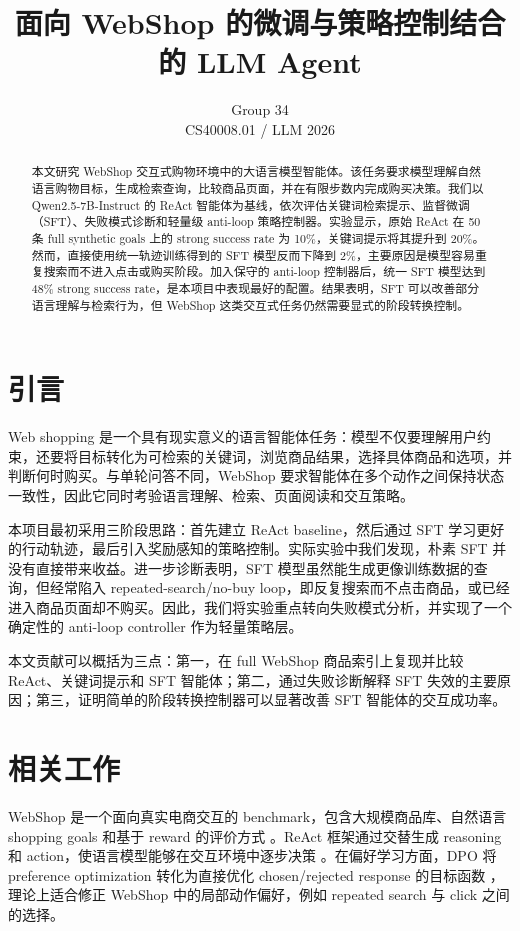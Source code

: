 \documentclass[11pt]{article}
\title{面向 WebShop 的微调与策略控制结合的 LLM Agent}
\author{
  Group 34 \\
  CS40008.01 / LLM 2026
}
\begin{document}
\maketitle

\begin{abstract}
本文研究 WebShop 交互式购物环境中的大语言模型智能体。该任务要求模型理解自然语言购物目标，生成检索查询，比较商品页面，并在有限步数内完成购买决策。我们以 Qwen2.5-7B-Instruct 的 ReAct 智能体为基线，依次评估关键词检索提示、监督微调（SFT）、失败模式诊断和轻量级 anti-loop 策略控制器。实验显示，原始 ReAct 在 50 条 full synthetic goals 上的 strong success rate 为 10\%，关键词提示将其提升到 20\%。然而，直接使用统一轨迹训练得到的 SFT 模型反而下降到 2\%，主要原因是模型容易重复搜索而不进入点击或购买阶段。加入保守的 anti-loop 控制器后，统一 SFT 模型达到 48\% strong success rate，是本项目中表现最好的配置。结果表明，SFT 可以改善部分语言理解与检索行为，但 WebShop 这类交互式任务仍然需要显式的阶段转换控制。
\end{abstract}

\section{引言}

Web shopping 是一个具有现实意义的语言智能体任务：模型不仅要理解用户约束，还要将目标转化为可检索的关键词，浏览商品结果，选择具体商品和选项，并判断何时购买。与单轮问答不同，WebShop 要求智能体在多个动作之间保持状态一致性，因此它同时考验语言理解、检索、页面阅读和交互策略。

本项目最初采用三阶段思路：首先建立 ReAct baseline，然后通过 SFT 学习更好的行动轨迹，最后引入奖励感知的策略控制。实际实验中我们发现，朴素 SFT 并没有直接带来收益。进一步诊断表明，SFT 模型虽然能生成更像训练数据的查询，但经常陷入 repeated-search/no-buy loop，即反复搜索而不点击商品，或已经进入商品页面却不购买。因此，我们将实验重点转向失败模式分析，并实现了一个确定性的 anti-loop controller 作为轻量策略层。

本文贡献可以概括为三点：第一，在 full WebShop 商品索引上复现并比较 ReAct、关键词提示和 SFT 智能体；第二，通过失败诊断解释 SFT 失效的主要原因；第三，证明简单的阶段转换控制器可以显著改善 SFT 智能体的交互成功率。

\section{相关工作}

WebShop 是一个面向真实电商交互的 benchmark，包含大规模商品库、自然语言 shopping goals 和基于 reward 的评价方式 \cite{yao2022webshop}。ReAct 框架通过交替生成 reasoning 和 action，使语言模型能够在交互环境中逐步决策 \cite{yao2022react}。在偏好学习方面，DPO 将 preference optimization 转化为直接优化 chosen/rejected response 的目标函数 \cite{rafailov2023dpo}，理论上适合修正 WebShop 中的局部动作偏好，例如 repeated search 与 click 之间的选择。
\end{document}
